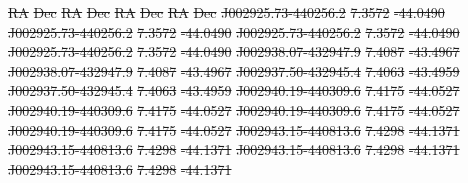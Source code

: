 \documentclass[11pt, a4paper]{book}
\providecommand{\DIFdeltex}[1]{{\protect\color{red}\sout{#1}}}                      %
\providecommand{\DIFdel}[1]{\texorpdfstring{\DIFdeltex{#1}}{}} %
\begin{document}
\DIFdel{RA }%
\DIFdel{Dec }%
\DIFdel{RA }%
\DIFdel{Dec }%
\DIFdel{RA }%
\DIFdel{Dec }%
\DIFdel{RA }%
\DIFdel{Dec}%
\DIFdel{J002925.73-440256.2 }%
\DIFdel{7.3572 }%
\DIFdel{-44.0490 }%
\DIFdel{J002925.73-440256.2 }%
\DIFdel{7.3572 }%
\DIFdel{-44.0490 }%
\DIFdel{J002925.73-440256.2 }%
\DIFdel{7.3572 }%
\DIFdel{-44.0490 }%
\DIFdel{J002925.73-440256.2 }%
\DIFdel{7.3572 }%
\DIFdel{-44.0490}%
\DIFdel{J002938.07-432947.9 }%
\DIFdel{7.4087 }%
\DIFdel{-43.4967 }%
\DIFdel{J002938.07-432947.9 }%
\DIFdel{7.4087 }%
\DIFdel{-43.4967 }%
\DIFdel{J002937.50-432945.4 }%
\DIFdel{7.4063 }%
\DIFdel{-43.4959 }%
\DIFdel{J002937.50-432945.4 }%
\DIFdel{7.4063 }%
\DIFdel{-43.4959}%
\DIFdel{J002940.19-440309.6 }%
\DIFdel{7.4175 }%
\DIFdel{-44.0527 }%
\DIFdel{J002940.19-440309.6 }%
\DIFdel{7.4175 }%
\DIFdel{-44.0527 }%
\DIFdel{J002940.19-440309.6 }%
\DIFdel{7.4175 }%
\DIFdel{-44.0527 }%
\DIFdel{J002940.19-440309.6 }%
\DIFdel{7.4175 }%
\DIFdel{-44.0527}%
\DIFdel{J002943.15-440813.6 }%
\DIFdel{7.4298 }%
\DIFdel{-44.1371 }%
\DIFdel{J002943.15-440813.6 }%
\DIFdel{7.4298 }%
\DIFdel{-44.1371 }%
\DIFdel{J002943.15-440813.6 }%
\DIFdel{7.4298 }%
\DIFdel{-44.1371 }%
\DIFdel{J002943.15-440813.6 }%
\DIFdel{7.4298 }%
\DIFdel{-44.1371}%
\end{document}
